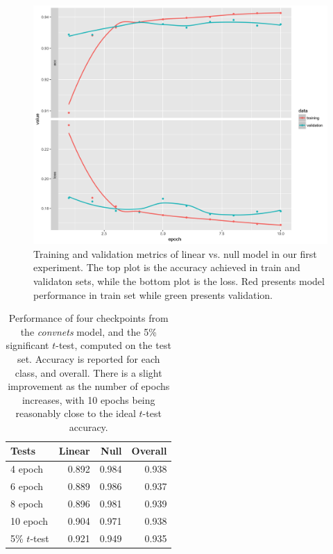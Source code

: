 \documentclass[12pt]{article}
\begin{document}
\begin{figure}[h]
\centerline{\includegraphics[width=15cm]{figures/linear_history_plot.png}}
\caption{Training and validation metrics of linear vs. null model in our first experiment. The top plot is the accuracy achieved in train and validaton sets, while the bottom plot is the loss. Red presents model performance in train set while green presents validation.}
\label{histlinear}
\end{figure}

\begin{table}[ht]
\begin{center}
\begin{tabular}{|l|rrr|}\hline
Tests & Linear & Null & Overall \\\hline
4 epoch & 0.892 & 0.984 &  0.938 \\   
6 epoch & 0.889 & 0.986 & 0.937 \\
8 epoch & 0.896 & 0.981 & 0.939 \\
10 epoch & 0.904 & 0.971 & 0.938 \\
5\% $t$-test & 0.921 & 0.949 & 0.935\\\hline
\end{tabular}
\end{center}
\caption{Performance of four checkpoints from the {\em convnets} model, and the 5\% significant $t$-test, computed on the test set. Accuracy is reported for each class, and overall. There is a slight improvement as the number of epochs increases, with 10 epochs being reasonably close to the ideal $t$-test accuracy.}
\label{checkpoints}
\end{table}
\end{document}
